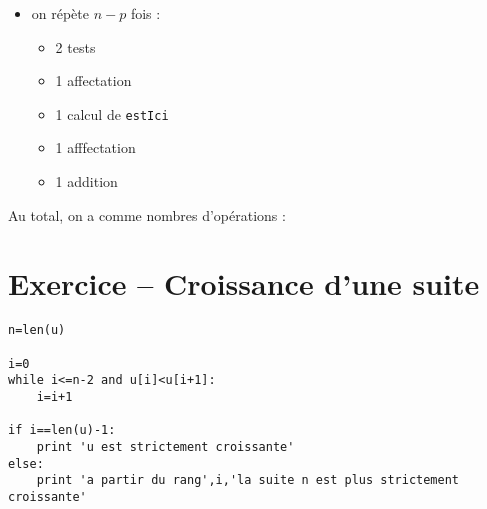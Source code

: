 \begin{enumerate}
\begin{itemize}
 \item on répète $n-p$ fois :
 \begin{itemize}
 \item 2 tests
 \item 1 affectation
 \item 1 calcul de \verb?estIci?
 \item 1 afffectation
 \item 1 addition
 \end{itemize}
 \end{itemize}
Au total, on a comme nombres d'opérations : \\
\end{enumerate}


\section{Exercice -- Croissance d'une suite}
\begin{verbatim}
n=len(u)

i=0
while i<=n-2 and u[i]<u[i+1]:
    i=i+1

if i==len(u)-1:
    print 'u est strictement croissante'
else:
    print 'a partir du rang',i,'la suite n est plus strictement croissante'
\end{verbatim}



